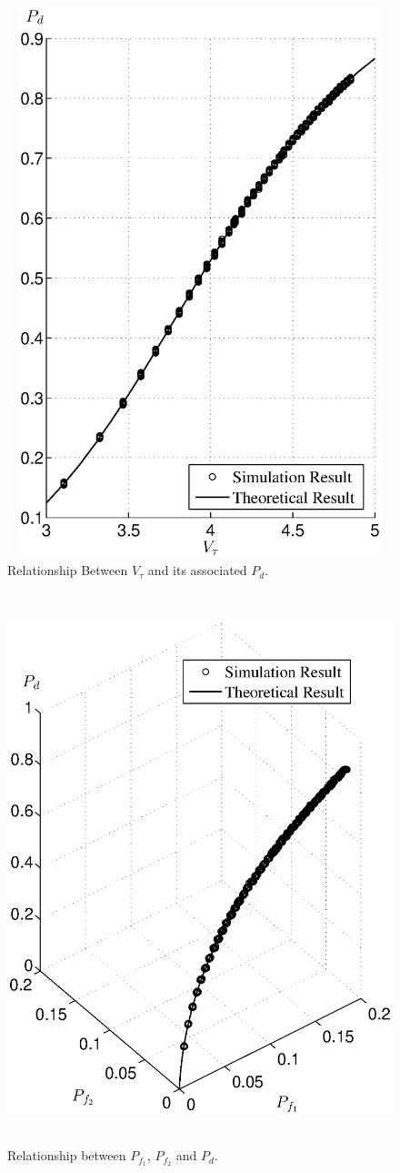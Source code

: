 \begin{figure}[!t]
\centering
\includegraphics[width=12cm, height=16cm]{4/tpd.eps}
\caption{Relationship Between $V_\tau$ and its associated $P_d$.}
\label{pic:2015may1a0}
\end{figure}

\begin{figure}[!t]
\centering
\includegraphics[width=12cm, height=16cm]{4/pdpf1pf2.eps}
\caption{Relationship between $P_{f_1}$, $P_{f_2}$ and $P_d$.}
\label{pic:2015may1a1}
\end{figure}


